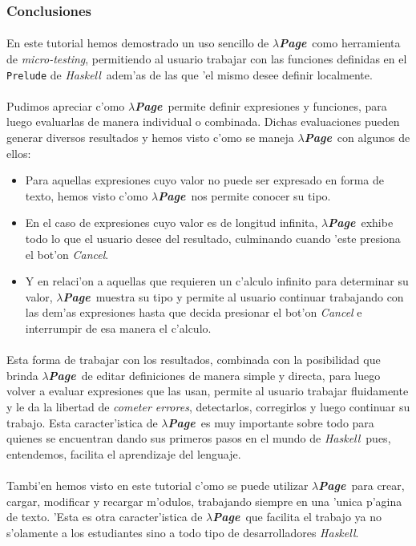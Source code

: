 \documentclass[a4paper]{article}
\newcommand{\haskell}{\textsl{Haskell}}
\newcommand{\hpage}{\textbf{\textsl{$\lambda$Page}}}
\begin{document}
\newpage
\subsubsection{Conclusiones}
\paragraph{}En este tutorial hemos demostrado un uso sencillo de \hpage\ como herramienta de \textsl{micro-testing}, permitiendo al usuario trabajar con las funciones definidas en el \texttt{Prelude} de \haskell\ adem'as de las que 'el mismo desee definir localmente.
\paragraph{}Pudimos apreciar c'omo \hpage\ permite definir expresiones y funciones, para luego evaluarlas de manera individual o combinada.  Dichas evaluaciones pueden generar diversos resultados y hemos visto c'omo se maneja \hpage\ con algunos de ellos:
\begin{itemize}
\item Para aquellas expresiones cuyo valor no puede ser expresado en forma de texto, hemos visto c'omo \hpage\ nos permite conocer su tipo.
\item En el caso de expresiones cuyo valor es de longitud infinita, \hpage\ exhibe todo lo que el usuario desee del resultado, culminando cuando 'este presiona el bot'on \textsl{Cancel}.
\item Y en relaci'on a aquellas que requieren un c'alculo infinito para determinar su valor, \hpage\ muestra su tipo y permite al usuario continuar trabajando con las dem'as expresiones hasta que decida presionar el bot'on \textsl{Cancel} e interrumpir de esa manera el c'alculo.
\end{itemize}
\paragraph{}Esta forma de trabajar con los resultados, combinada con la posibilidad que brinda \hpage\ de editar definiciones de manera simple y directa, para luego volver a evaluar expresiones que las usan, permite al usuario trabajar fluidamente y le da la libertad de \textsl{cometer errores}, detectarlos, corregirlos y luego continuar su trabajo.  Esta caracter'istica de \hpage\ es muy importante sobre todo para quienes se encuentran dando sus primeros pasos en el mundo de \haskell\ pues, entendemos, facilita el aprendizaje del lenguaje.
\paragraph{}Tambi'en hemos visto en este tutorial c'omo se puede utilizar \hpage\ para crear, cargar, modificar y recargar m'odulos, trabajando siempre en una 'unica p'agina de texto.  'Esta es otra caracter'istica de \hpage\ que facilita el trabajo ya no s'olamente a los estudiantes sino a todo tipo de desarrolladores \haskell.
\end{document}
